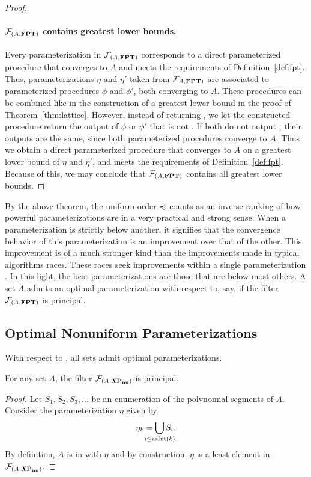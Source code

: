 \begin{proof}
  \paragraph{$\mathcal{F}_{(A, \textnormal{\textbf{FPT}})}$ contains greatest lower bounds.}
  Every parameterization in $\mathcal{F}_{(A, \textnormal{\textbf{FPT}})}$ corresponds to a direct parameterized procedure that converges to $A$ and meets the requirements of Definition~\ref{def:fpt}.
  Thus, parameterizations $\eta$ and $\eta'$ taken from $\mathcal{F}_{A, \textnormal{\textbf{FPT}})}$ are associated to parameterized procedures $\phi$ and $\phi'$, both converging to $A$.
  These procedures can be combined like in the construction of a greatest lower bound in the proof of Theorem~\ref{thm:lattice}.
  However, instead of returning , we let the constructed procedure return the output of $\phi$ or $\phi'$ that is not .
  If both do not output , their outputs are the same, since both parameterized procedures converge to $A$.
  Thus we obtain a direct parameterized procedure that converges to $A$ on a greatest lower bound of $\eta$ and $\eta'$, and meets the requirements of Definition~\ref{def:fpt}.
  Because of this, we may conclude that $\mathcal{F}_{(A, \textnormal{\textbf{FPT}})}$ contains all greatest lower bounds.
\end{proof}

By the above theorem, the uniform order $\preccurlyeq$ counts as an inverse ranking of how powerful parameterizations are in a very practical and strong sense.
When a parameterization is strictly below another, it signifies that the convergence behavior of this parameterization is an improvement over that of the other.
This improvement is of a much stronger kind than the improvements made in typical algorithms races.
These races seek improvements within a single parameterization \parencite{komusiewicz2012new,fellows2013towards}.
In this light, the best parameterizations are those that are below most others.
A set $A$ admits an optimal parameterization with respect to, say,  if the filter $\mathcal{F}_{(A, \textnormal{\textbf{FPT}})}$ is principal.

\subsection{Optimal Nonuniform Parameterizations}
With respect to , all sets admit optimal parameterizations.
\begin{theorem}
\label{thm:nuxpprincipal}
  For any set $A$, the filter $\mathcal{F}_{(A, \textnormal{\textbf{\textit{X}P$_\textbf{nu}$}})}$ is principal.
\end{theorem}
\begin{proof}
  Let $S_1, S_2, S_3, \ldots$ be an enumeration of the polynomial segments of $A$.
  Consider the parameterization $\eta$ given by
  \begin{equation*}
    \eta_k \deq \bigcup_{\mathclap{i \le \asNat(k)}} S_i.
  \end{equation*}
  By definition, $A$ is in  with $\eta$ and by construction, $\eta$ is a least element in $\mathcal{F}_{(A, \textnormal{\textbf{\textit{X}P$_\textbf{nu}$}})}$.
\end{proof}

